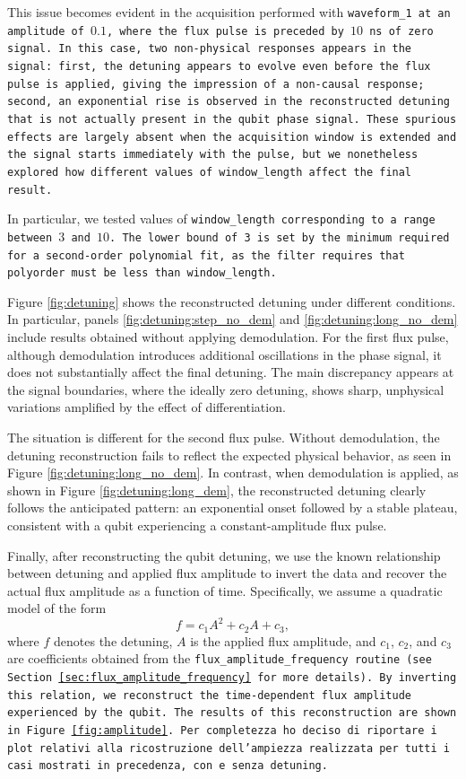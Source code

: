 This issue becomes evident in the acquisition performed with \tt{waveform\_1} at an amplitude of $0.1$, where the flux pulse is preceded by $10$ ns of zero signal. 
In this case, two non-physical responses appears in the signal: first, the detuning appears to evolve even before the flux pulse is applied, giving the impression of a non-causal response; second, an exponential rise is observed in the reconstructed detuning that is not actually present in the qubit phase signal. 
These spurious effects are largely absent when the acquisition window is extended and the signal starts immediately with the pulse, but we nonetheless explored how different values of \texttt{window\_length} affect the final result.

In particular, we tested values of \tt{window\_length} corresponding to a range between $3$ and $10$. 
The lower bound of 3 is set by the minimum required for a second-order polynomial fit, as the filter requires that \tt{polyorder} must be less than \tt{window\_length}.

Figure \ref{fig:detuning} shows the reconstructed detuning under different conditions. 
In particular, panels \ref{fig:detuning:step_no_dem} and \ref{fig:detuning:long_no_dem} include results obtained without applying demodulation. 
For the first flux pulse, although demodulation introduces additional oscillations in the phase signal, it does not substantially affect the final detuning.
The main discrepancy appears at the signal boundaries, where the ideally zero detuning, shows sharp, unphysical variations amplified by the effect of differentiation.

The situation is different for the second flux pulse. 
Without demodulation, the detuning reconstruction fails to reflect the expected physical behavior, as seen in Figure \ref{fig:detuning:long_no_dem}. 
In contrast, when demodulation is applied, as shown in Figure \ref{fig:detuning:long_dem}, the reconstructed detuning clearly follows the anticipated pattern: an exponential onset followed by a stable plateau, consistent with a qubit experiencing a constant-amplitude flux pulse.

Finally, after reconstructing the qubit detuning, we use the known relationship between detuning and applied flux amplitude to invert the data and recover the actual flux amplitude as a function of time. 
Specifically, we assume a quadratic model of the form
\begin{equation}
    f = c_1 A^2 + c_2 A + c_3,
\end{equation}
where $f$ denotes the detuning, $A$ is the applied flux amplitude, and $c_1$, $c_2$, and $c_3$ are coefficients obtained from the \tt{flux\_amplitude\_frequency} routine (see Section \ref{sec:flux_amplitude_frequency} for more details). 
By inverting this relation, we reconstruct the time-dependent flux amplitude experienced by the qubit. 
The results of this reconstruction are shown in Figure \ref{fig:amplitude}.
Per completezza ho deciso di riportare i plot relativi alla ricostruzione dell'ampiezza realizzata per tutti i casi mostrati in precedenza, con e senza detuning.

